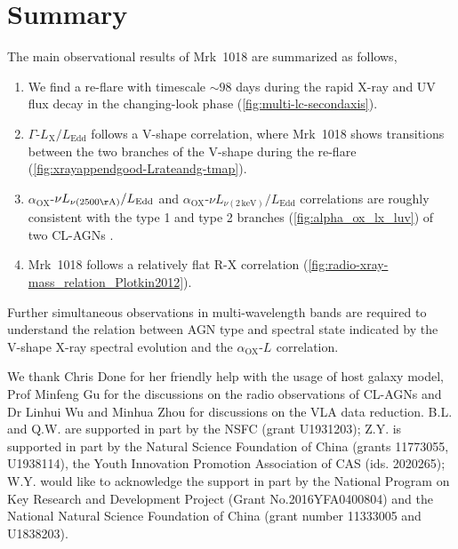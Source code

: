 \documentclass[twocolumn]{aastex63}
\newcommand{\alphaox}{$\alpha_\mathrm{OX}$}
\begin{document}
\section{Summary}
\label{sec:conclusion}
The main observational results of Mrk~1018 are summarized as follows,
\begin{enumerate}
\item We find a re-flare with timescale $\sim 98$ days during the rapid X-ray and UV flux decay in the changing-look phase (\autoref{fig:multi-lc-secondaxis}).

\item $\Gamma$-$L_\mathrm{X}/L_\mathrm{Edd}$ follows a V-shape correlation, where Mrk~1018 shows transitions between the two branches of the V-shape during the re-flare (\autoref{fig:xrayappendgood-Lrateandg-tmap}).

\item  \alphaox-$\nu L_{\nu(\mathrm{2500 \AA})}/L_\mathrm{Edd}$ and \alphaox-$\nu L_{\nu(\mathrm{2\,keV})}/L_\mathrm{Edd}$ correlations are roughly consistent with the type 1 and type 2 branches (\autoref{fig:alpha_ox_lx_luv}) of two CL-AGNs \citep[see][]{2019arXiv190904676R}.

\item Mrk~1018 follows a relatively flat R-X correlation (\autoref{fig:radio-xray-mass_relation_Plotkin2012}). 

\end{enumerate}
Further simultaneous observations in multi-wavelength bands are required to understand the relation between AGN type and spectral state indicated by the V-shape X-ray spectral evolution and the \alphaox-${L_\mathrm{}}$ correlation. 



\acknowledgments
\vspace{5mm}

We thank Chris Done for her friendly help with the usage of host galaxy model, Prof Minfeng Gu for the discussions on the radio observations of CL-AGNs and Dr Linhui Wu and Minhua Zhou for discussions on the VLA data reduction. B.L. and Q.W. are supported in part by the NSFC (grant U1931203); Z.Y. is supported in part by the Natural Science Foundation of China (grants 11773055, U1938114), the Youth Innovation Promotion Association of CAS (ids. 2020265); W.Y. would like to acknowledge the support in part by the National Program on Key Research and Development Project (Grant No.2016YFA0400804) and the National Natural Science Foundation of China (grant number 11333005 and U1838203).
\end{document}
